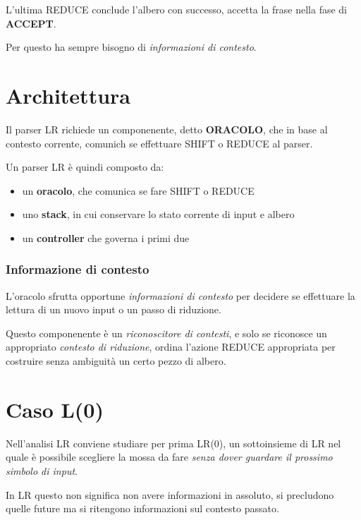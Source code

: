 L'ultima REDUCE conclude l'albero con successo, accetta la frase nella fase di \textbf{ACCEPT}.

Per questo ha sempre bisogno di \textit{informazioni di contesto}.

\section{Architettura}
Il parser LR richiede un componenente, detto \textbf{ORACOLO}, che in base al contesto corrente, comunich se effettuare SHIFT o REDUCE al parser.

Un parser LR è quindi composto da:
\begin{itemize}
    \item un \textbf{oracolo}, che comunica se fare SHIFT o REDUCE
    \item uno \textbf{stack}, in cui conservare lo stato corrente di input e albero
    \item un \textbf{controller} che governa i primi due
\end{itemize}

\subsubsection{Informazione di contesto}
L'oracolo sfrutta opportune \textit{informazioni di contesto} per decidere se effettuare la lettura di un nuovo input o un passo di riduzione.

Questo componenente è un \textit{riconoscitore di contesti}, e solo se riconosce un appropriato \textit{contesto di riduzione}, ordina l'azione REDUCE appropriata per costruire senza ambiguità un certo pezzo di albero.

\section{Caso L(0)}

Nell'analisi LR conviene studiare per prima LR(0), un sottoinsieme di LR nel quale è possibile scegliere la mossa da fare \textit{senza dover guardare il prossimo simbolo di input}.

In LR questo non significa non avere informazioni in assoluto, si precludono quelle future ma si ritengono informazioni sul contesto passato.

